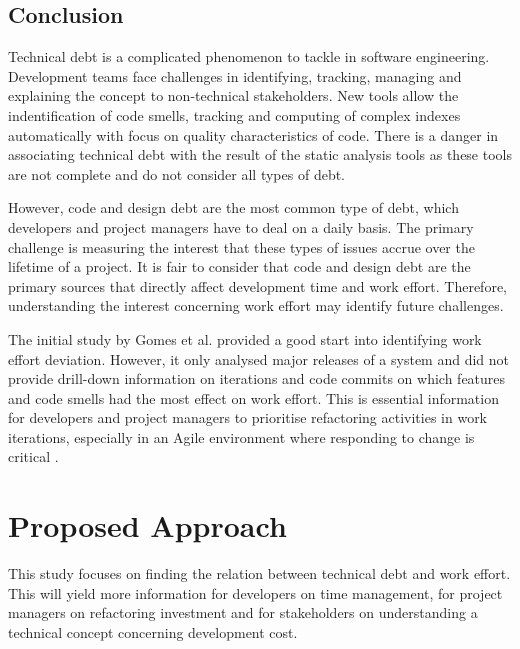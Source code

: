 \documentclass{mprop}
\begin{document}
\subsection{Conclusion}

Technical debt is a complicated phenomenon to tackle in software engineering.
Development teams face challenges in identifying, tracking, managing and
explaining the concept to non-technical stakeholders. New tools allow the
indentification of code smells, tracking and computing of complex indexes
automatically with focus on quality characteristics of code. There is a danger
in associating technical debt with the result of the static analysis tools as
these tools are not complete and do not consider all types of debt.

However, code and design debt are the most common type of debt, which developers
and project managers have to deal on a daily basis. The primary challenge is
measuring the interest that these types of issues accrue over the lifetime of a
project. It is fair to consider that code and design debt are the primary
sources that directly affect development time and work effort. Therefore,
understanding the interest concerning work effort may identify future
challenges.

The initial study by Gomes et al. \cite{Gomes2011} provided a good start into
identifying work effort deviation. However, it only analysed major releases of a
system and did not provide drill-down information on iterations and code commits
on which features and code smells had the most effect on work effort. This is
essential information for developers and project managers to prioritise
refactoring activities in work iterations, especially in an Agile environment
where responding to change is critical \cite{agile-manifesto}.

\section{Proposed Approach}
\label{proposed-work}

This study focuses on finding the relation between technical debt and work
effort. This will yield more information for developers on time management, for
project managers on refactoring investment and for stakeholders on understanding
a technical concept concerning development cost.
\end{document}
